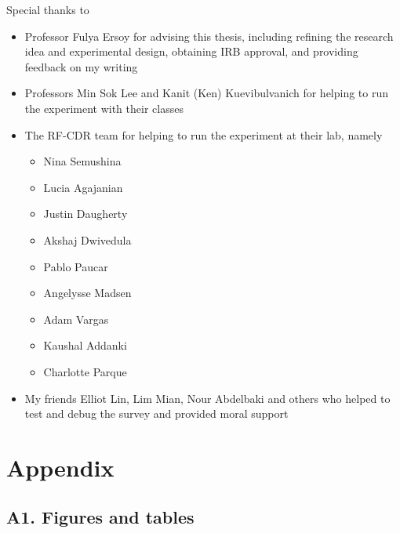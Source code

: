 \documentclass[
  12,
  letterpaper,
  DIV=11,
  numbers=noendperiod]{scrartcl}
\providecommand{\tightlist}{%
  \setlength{\itemsep}{0pt}\setlength{\parskip}{0pt}}\usepackage{longtable,booktabs,array}
\begin{document}
Special thanks to

\begin{itemize}
\tightlist
\item
  Professor Fulya Ersoy for advising this thesis, including refining the
  research idea and experimental design, obtaining IRB approval, and
  providing feedback on my writing
\item
  Professors Min Sok Lee and Kanit (Ken) Kuevibulvanich for helping to
  run the experiment with their classes
\item
  The RF-CDR team for helping to run the experiment at their lab, namely

  \begin{itemize}
  \tightlist
  \item
    Nina Semushina
  \item
    Lucia Agajanian
  \item
    Justin Daugherty
  \item
    Akshaj Dwivedula
  \item
    Pablo Paucar
  \item
    Angelysse Madsen
  \item
    Adam Vargas
  \item
    Kaushal Addanki
  \item
    Charlotte Parque
  \end{itemize}
\item
  My friends Elliot Lin, Lim Mian, Nour Abdelbaki and others who helped
  to test and debug the survey and provided moral support
\end{itemize}

\newpage

\section{Appendix}\label{appendix}

\subsection{A1. Figures and tables}\label{a1.-figures-and-tables}
\end{document}

